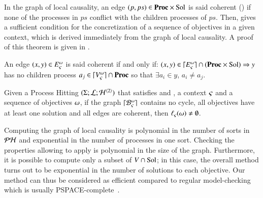 In the graph of local causality, an edge $(p, ps) \in \mathbf{Proc} \times \mathrm{Sol}$
is said coherent () if none of the processes in $ps$ conflict with the children processes of $ps$.
Then,  gives a sufficient condition for the concretization of a sequence of objectives in a given context,
which is derived immediately from the graph of local causality.
A proof of this theorem is given in .
\begin{definition}
\label{def:coherent}
  An edge $(x, y) \in E_\varsigma^\omega$ is said coherent if and only if:
  $(x, y) \in \lceil E_\varsigma^\omega\rceil \cap (\mathbf{Proc} \times \mathrm{Sol}) \Rightarrow y$ has no children process $a_j \in \lceil V_\varsigma^\omega\rceil \cap \mathbf{Proc}$ so that $\exists a_i \in y$, $a_i \neq a_j$.
\end{definition}

\begin{theorem}
\label{th:approxinf}
Given a Process Hitting $(\Sigma; \mathcal{L}; \mathcal{H}^{\langle 2 \rangle})$
that satisfies  and ,
a context $\varsigma$ and a sequence of objectives $\omega$,
  if the graph $\lceil \mathcal{B}_\varsigma^\omega\rceil$ contains no cycle,
  all objectives have at least one solution
  and all edges are coherent,
  then $\ell_\varsigma(\omega) \neq \emptyset$.
\end{theorem}

Computing the graph of local causality is polynomial in the number of sorts in $\mathcal{PH}$ and exponential in the number of processes in one sort.
Checking the properties allowing to apply  is polynomial in the size of the graph.
Furthermore, it is possible to compute only a subset of $V \cap \mathrm{Sol}$;
in this case, the overall method turns out to be exponential in the number of solutions to each objective.
Our method can thus be considered as efficient compared to regular model-checking which is usually PSPACE-complete~\cite{Harel02}.




